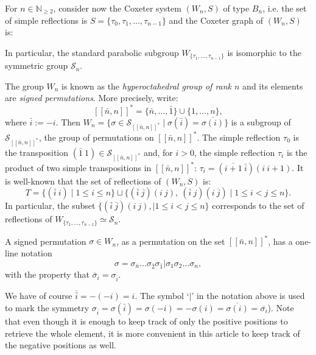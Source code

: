 \documentclass[Unicode]{cedram-alco}
\theoremstyle{definition}
\newcommand{\Bsetnn}{[\![\bar{n},n ]\!]^*}
\begin{document}
For $n\in\mathbb N_{\geq 2}$, consider now the Coxeter system   $(W_n, S)$ of type $B_n$, i.e.  the set of simple reflections is $S= \lbrace \tau_0, \tau_1, \dots, \tau_{n-1} \rbrace$ and the Coxeter graph of $(W_n,S)$ is: 
\begin{center}
\end{center}
In particular, the standard parabolic subgroup $W_{\{\tau_1,\dots,\tau_{n-1}\}}$ is isomorphic to the symmetric group $\mathcal S_n$. 

The group $W_n$ is known as the {\em hyperoctahedral group of rank $n$} and its elements are {\em signed permutations}. More precisely, write:
$$
\Bsetnn=\lbrace \bar n, \dots, \bar 1 \rbrace \cup \lbrace 1, \dots, n \rbrace,
$$ 
where  $\bar{i}:=-i$. Then $W_n=\{\sigma \in \mathcal S_{\Bsetnn}\mid \sigma(\bar i) = \overline{\sigma(i)}\}$ is a subgroup of  $\mathcal S_{\Bsetnn}$, the group of permutations on $\Bsetnn$. The simple reflection $\tau_0$ is the transposition $(\bar 1\ 1)\in \mathcal S_{\Bsetnn}$ and, for $i>0$, the simple reflection $\tau_i$ is the product of two simple transpositions in $\Bsetnn$: $\tau_i= (\overline{i+1}\ \bar i)(i\ i+1)$. It is well-known that the set of reflections of $(W_n,S)$ is:
$$
T=\{(\bar i \ i )\mid 1\leq i\leq n\}\sqcup\{  ( \bar i\ \overline{j})(i\ j) ,\ (\bar i\ j)(i\ \overline{j})\mid 1\leq i< j\leq n \}.
$$
In particular, the subset $\{  ( \bar i\ \overline{j})(i\ j),  \mid 1\leq i< j\leq n \}$ corresponds to the set of reflections of $W_{\{\tau_1,\dots,\tau_{n-1}\}}\simeq\mathcal S_n$. 


A signed permutation $\sigma \in W_n$, as a permutation on the set  $\Bsetnn$, has a one-line notation
$$
\sigma=\sigma_{\bar n}\dots \sigma_{\bar 2}\sigma_{\bar 1}| \sigma_1 \sigma_2\dots \sigma_n,
$$
with the property that $\bar \sigma_i = \sigma_{\bar i}$.

\begin{remark} We have of course $\overline{\bar i} = -(-i)=i$.  The symbol `$|$' in the notation above is used to mark the symmetry $\sigma_{\bar i}=\sigma(\bar i)=\sigma(-i)=-\sigma(i)=\overline{\sigma(i)}=\overline{\sigma_i}$). Note that even though it is enough to keep track of only the positive positions to retrieve the whole element, it is more convenient in this article to keep track of the negative positions as well.
\end{remark}
\end{document}
